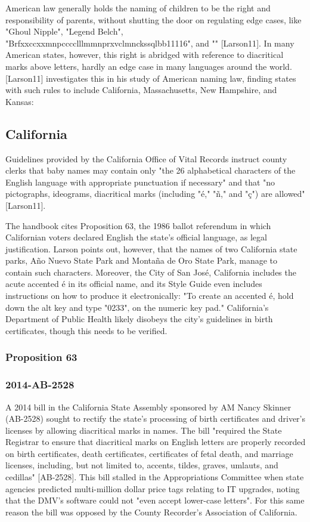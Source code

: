 American law generally holds the naming of children to be the right and
responsibility of parents, without shutting the door on regulating edge cases,
like "Ghoul Nipple", "Legend Belch",
"Brfxxccxxmnpcccclllmmnprxvclmnckssqlbb11116", and "" {[}Larson11{]}. In many
American states, however, this right is abridged with reference to diacritical
marks above letters, hardly an edge case in many languages around the world.
{[}Larson11{]} investigates this in his study of American naming law, finding
states with such rules to include California, Massachusetts, New Hampshire, and
Kansas:

\subsection{California}

Guidelines provided by the California Office of Vital Records instruct
county clerks that baby names may contain only "the 26 alphabetical
characters of the English language with appropriate punctuation if
necessary" and that "no pictographs, ideograms, diacritical marks
(including "é," "ñ," and "ç") are allowed" {[}Larson11{]}.

The handbook cites Proposition 63, the 1986 ballot referendum in which
Californian voters declared English the state's official language, as
legal justification. Larson points out, however, that the names of two
California state parks, Año Nuevo State Park and Montaña de Oro State
Park, manage to contain such characters. Moreover, the City of San José,
California includes the acute accented é in its official name, and its
Style Guide even includes instructions on how to produce it
electronically: "To create an accented é, hold down the alt key and
type "0233"‚ on the numeric key pad." California's Department of
Public Health likely disobeys the city's guidelines in birth
certificates, though this needs to be verified.

\subsubsection{Proposition 63}

\subsubsection{2014-AB-2528}

A 2014 bill in the California State Assembly sponsored by AM Nancy Skinner
(AB-2528) sought to rectify the state's processing of birth certificates and
driver's licenses by allowing diacritical marks in names. The bill "required the
State Registrar to ensure that diacritical marks on English letters are properly
recorded on birth certificates, death certificates, certificates of fetal death,
and marriage licenses, including, but not limited to, accents, tildes, graves,
umlauts, and cedillas" {[}AB-2528{]}. This bill stalled in the Appropriations
Committee when state agencies predicted multi-million dollar price tags relating
to IT upgrades, noting that the DMV's software could not "even accept lower-case
letters". For this same reason the bill was opposed by the County Recorder's
Association of California.

